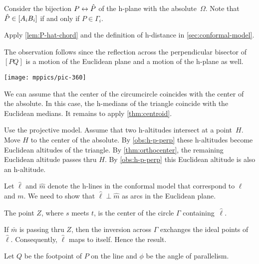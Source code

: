 

Consider the bijection $P\leftrightarrow \hat P$ of the h-plane with the absolute~$\Omega$.
Note that $\hat P\in [A_iB_i]$ if and only if $P\in\Gamma_i$.

 Apply \ref{lem:P-hat-chord} and the definition of h-distance in \ref{sec:conformal-model}.

The observation follows since the reflection across the perpendicular bisector of $[PQ]$ is a motion of the Euclidean plane and a motion of the h-plane as well.

\begin{Figure}
\centering
\vskip-0mm
\texttt{[image: mppics/pic-360]}
\end{Figure}

We can assume that the center of the circumcircle coincides with the center of the absolute.
In this case, the h-medians of the triangle coincide with the Euclidean medians.
It remains to apply \ref{thm:centroid}.

Use the projective model.
Assume that two h-altitudes intersect at a point~$H$.
Move $H$ to the center of the absolute.
By \ref{obs:h-p-perp} these h-altitudes become Euclidean altitudes of the triangle.
By \ref{thm:orthocenter}, the remaining Euclidean altitude passes thru $H$.
By \ref{obs:h-p-perp} this Euclidean altitude is also an h-altitude.

Let $\hat\ell$ and $\hat m$ denote the h-lines in the conformal model that correspond to $\ell$ and $m$.
We need to show that $\hat\ell\perp\hat m$ as arcs in the Euclidean plane.

The point $Z$, where $s$ meets $t$, is the center of the circle $\Gamma$ containing~$\hat\ell$.

If $\bar m$ is passing thru $Z$, then the inversion across $\Gamma$ exchanges the ideal points of~$\hat\ell$.
Consequently, $\hat\ell$ maps to itself. 
Hence the result.

Let $Q$ be the footpoint of $P$ on the line and $\phi$ be the angle of parallelism. 

